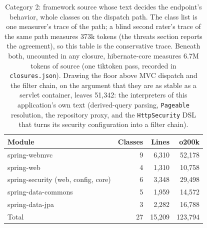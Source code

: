 \documentclass[journal]{IEEEtran}
\begin{document}
\begin{table}[H]
\centering
\footnotesize\setlength{\tabcolsep}{4pt}
\begin{tabular}{@{}lrrr@{}}
\toprule
Module & Classes & Lines & o200k \\
\midrule
spring-webmvc & 9 & 6{,}310 & 52{,}178 \\
spring-web & 4 & 1{,}310 & 10{,}758 \\
spring-security (web, config, core) & 6 & 3{,}348 & 29{,}498 \\
spring-data-commons & 5 & 1{,}959 & 14{,}572 \\
spring-data-jpa & 3 & 2{,}282 & 16{,}788 \\
\midrule
Total & 27 & 15{,}209 & 123{,}794 \\
\bottomrule
\end{tabular}
\caption{Category 2: framework source whose text decides the endpoint's
behavior, whole classes on the dispatch path. The class list is one measurer's trace of the
path; a blind second rater's trace of the same path measures 373k tokens
(the threats section reports the agreement), so this table is the
conservative trace. Beneath both, uncounted in any closure,
hibernate-core measures 6.7M tokens of source (one tiktoken pass,
recorded in \texttt{closures.json}).
Drawing the floor above MVC dispatch and the filter chain, on the argument
that they are as stable as a servlet container, leaves 51,342: the
interpreters of this application's own text (derived-query parsing,
\texttt{Pageable} resolution, the repository proxy, and the
\texttt{HttpSecurity} DSL that turns its security configuration into a
filter chain).}
\label{tab:cat2}
\end{table}
\end{document}
